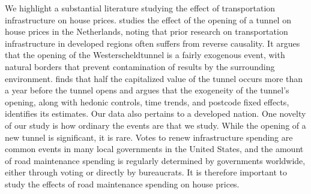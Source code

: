 
We highlight a substantial literature studying the effect of transportation infrastructure on house prices. \cite{hoogendoorn2019house} studies the effect of the opening of a tunnel on house prices in the Netherlands, noting that prior research on transportation infrastructure in developed regions often suffers from reverse causality. It argues that the opening of the Westerscheldtunnel is a fairly exogenous event, with natural borders that prevent contamination of results by the surrounding environment. \cite{hoogendoorn2019house} finds that half the capitalized value of the tunnel occurs more than a year before the tunnel opens and argues that the exogeneity of the tunnel's opening, along with hedonic controls, time trends, and postcode fixed effects, identifies its estimates. Our data also pertains to a developed nation. One novelty of our study is how ordinary the events are that we study. While the opening of a new tunnel is significant, it is rare. Votes to renew infrastructure spending are common events in many local governments in the United States, and the amount of road maintenance spending is regularly determined by governments worldwide, either through voting or directly by bureaucrats. It is therefore important to study the effects of road maintenance spending on house prices.

